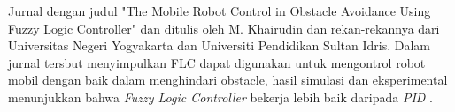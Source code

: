 \begin{packed_enum}
	\item Jurnal dengan judul "The Mobile Robot Control in Obstacle Avoidance Using Fuzzy Logic Controller" dan ditulis oleh M. Khairudin dan rekan-rekannya dari Universitas Negeri Yogyakarta dan Universiti Pendidikan Sultan Idris. Dalam jurnal tersbut menyimpulkan FLC dapat digunakan untuk mengontrol robot mobil dengan baik dalam menghindari obstacle, hasil simulasi dan eksperimental menunjukkan bahwa \textit{Fuzzy Logic Controller} bekerja lebih baik daripada \textit{PID} \cite{khairudin2020mobile}.
	 
\end{packed_enum}
